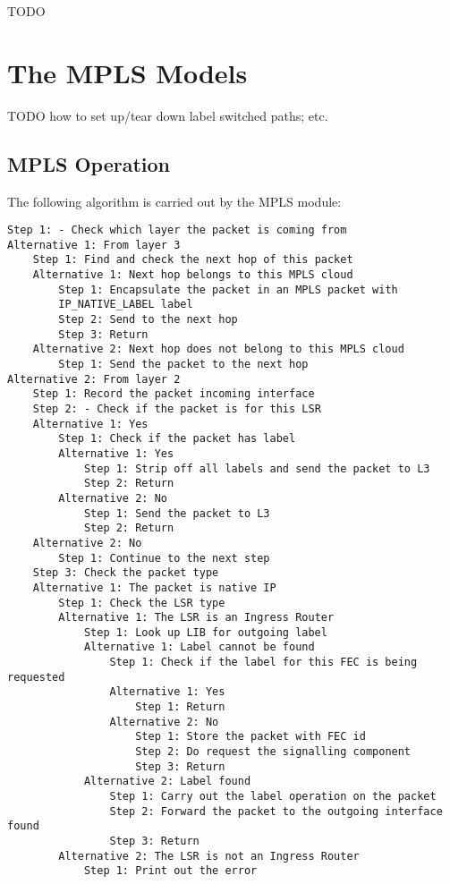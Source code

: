 \ifdraft TODO

\chapter{The MPLS Models}
\label{cha:mpls}

TODO how to set up/tear down label switched paths; etc.

\section{MPLS Operation}

The following algorithm is carried out by the MPLS module:

\begin{verbatim}
Step 1: - Check which layer the packet is coming from
Alternative 1: From layer 3
    Step 1: Find and check the next hop of this packet
    Alternative 1: Next hop belongs to this MPLS cloud
        Step 1: Encapsulate the packet in an MPLS packet with
        IP_NATIVE_LABEL label
        Step 2: Send to the next hop
        Step 3: Return
    Alternative 2: Next hop does not belong to this MPLS cloud
        Step 1: Send the packet to the next hop
Alternative 2: From layer 2
    Step 1: Record the packet incoming interface
    Step 2: - Check if the packet is for this LSR
    Alternative 1: Yes
        Step 1: Check if the packet has label
        Alternative 1: Yes
            Step 1: Strip off all labels and send the packet to L3
            Step 2: Return
        Alternative 2: No
            Step 1: Send the packet to L3
            Step 2: Return
    Alternative 2: No
        Step 1: Continue to the next step
    Step 3: Check the packet type
    Alternative 1: The packet is native IP
        Step 1: Check the LSR type
        Alternative 1: The LSR is an Ingress Router
            Step 1: Look up LIB for outgoing label
            Alternative 1: Label cannot be found
                Step 1: Check if the label for this FEC is being requested
                Alternative 1: Yes
                    Step 1: Return
                Alternative 2: No
                    Step 1: Store the packet with FEC id
                    Step 2: Do request the signalling component
                    Step 3: Return
            Alternative 2: Label found
                Step 1: Carry out the label operation on the packet
                Step 2: Forward the packet to the outgoing interface found
                Step 3: Return
        Alternative 2: The LSR is not an Ingress Router
            Step 1: Print out the error

\end{verbatim}
